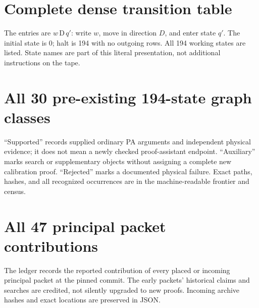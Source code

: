 \documentclass[10pt,letterpaper]{article}
\newcommand{\act}[3]{#1\,\mathrm{#2}\,#3}
\begin{document}
\appendix
\clearpage
\section{Complete dense transition table}
\label{app:table}
The entries are $\act{w}{D}{q'}$: write $w$, move in direction $D$, and
enter state $q'$. The initial state is 0; halt is 194 with no outgoing
rows. All 194 working states are listed. State names are part of this
literal presentation, not additional instructions on the tape.


\clearpage
\section{All 30 pre-existing 194-state graph classes}
\label{app:frontier}
``Supported'' records supplied ordinary PA arguments and independent
physical evidence; it does not mean a newly checked proof-assistant endpoint.
``Auxiliary'' marks search or supplementary objects without assigning a
complete new calibration proof. ``Rejected'' marks a documented physical
failure. Exact paths, hashes, and all recognized occurrences are in the
machine-readable frontier and census.


\clearpage
\section{All 47 principal packet contributions}
\label{app:ledger}
The ledger records the reported contribution of every placed or incoming
principal packet at the pinned commit. The early packets' historical
claims and searches are credited, not silently upgraded to new proofs.
Incoming archive hashes and exact locations are preserved in JSON.

\end{document}
